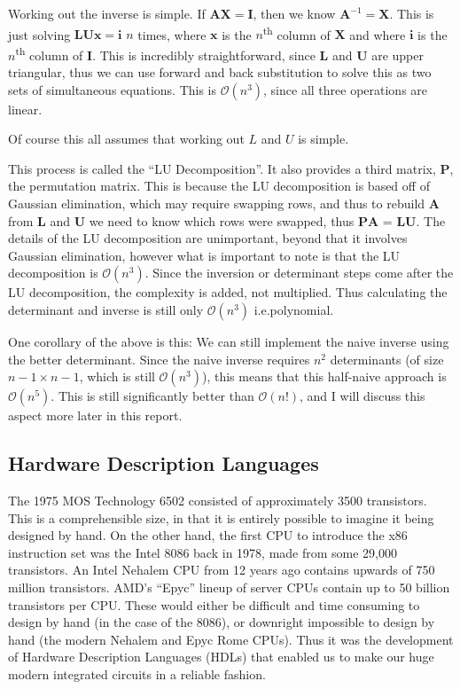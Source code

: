 \documentclass[12pt]{article}
\begin{document}
Working out the inverse is simple. If $\mathbf{AX}=\mathbf{I}$, then we know $\mathbf{A}^{-1} = \mathbf{X}$. This is just solving $\mathbf{LUx}=\mathbf{i}$ $n$ times, where $\mathbf{x}$ is the $n$\textsuperscript{th} column of $\mathbf{X}$ and where $\mathbf{i}$ is the $n$\textsuperscript{th} column of $\mathbf{I}$. This is incredibly straightforward, since $\mathbf{L}$ and $\mathbf{U}$ are upper triangular, thus we can use forward and back substitution to solve this as two sets of simultaneous equations. This is $\mathcal{O}(n^3)$, since all three operations are linear.

Of course this all assumes that working out $L$ and $U$ is simple.

This process is called the ``LU Decomposition''. It also provides a third matrix, $\mathbf{P}$, the permutation matrix. This is because the LU decomposition is based off of Gaussian elimination, which may require swapping rows, and thus to rebuild $\mathbf{A}$ from $\mathbf{L}$ and $\mathbf{U}$ we need to know which rows were swapped, thus $\mathbf{PA}$ = $\mathbf{LU}$. The details of the LU decomposition are unimportant, beyond that it involves Gaussian elimination, however what is important to note is that the LU decomposition is $\mathcal{O}(n^3)$. Since the inversion or determinant steps come after the LU decomposition, the complexity is added, not multiplied. Thus calculating the determinant and inverse is still only $\mathcal{O}(n^3)$ i.e.\@ polynomial.

One corollary of the above is this: We can still implement the naive inverse using the better determinant. Since the naive inverse requires $n^2$ determinants (of size $n-1 \times n-1$, which is still $\mathcal{O}(n^3)$), this means that this half-naive approach is $\mathcal{O}(n^5)$. This is still significantly better than $\mathcal{O}(n!)$, and I will discuss this aspect more later in this report.

\subsection{Hardware Description Languages}

The 1975 MOS Technology 6502 consisted of approximately 3500 transistors. This is a comprehensible size, in that it is entirely possible to imagine it being designed by hand. On the other hand, the first CPU to introduce the x86 instruction set was the Intel 8086 back in 1978, made from some 29,000 transistors. An Intel Nehalem CPU from 12 years ago contains upwards of 750 million transistors. AMD's ``Epyc'' lineup of server CPUs contain up to 50 billion transistors per CPU. These would either be difficult and time consuming to design by hand (in the case of the 8086), or downright impossible to design by hand (the modern Nehalem and Epyc Rome CPUs). Thus it was the development of Hardware Description Languages (HDLs) that enabled us to make our huge modern integrated circuits in a reliable fashion.
\end{document}

